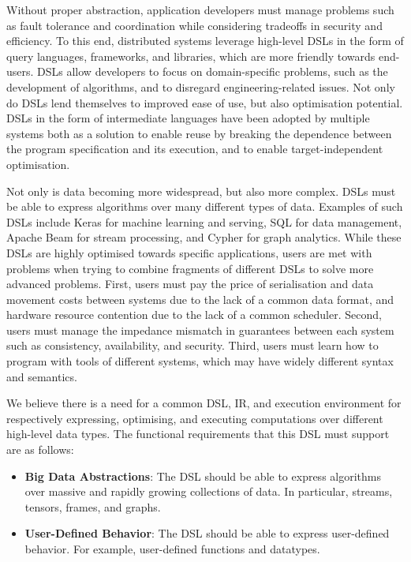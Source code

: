 Without proper abstraction, application developers must manage problems such as fault tolerance and coordination while considering tradeoffs in security and efficiency. To this end, distributed systems leverage high-level DSLs in the form of query languages, frameworks, and libraries, which are more friendly towards end-users. DSLs allow developers to focus on domain-specific problems, such as the development of algorithms, and to disregard engineering-related issues. Not only do DSLs lend themselves to improved ease of use, but also optimisation potential. DSLs in the form of intermediate languages have been adopted by multiple systems both as a solution to enable reuse by breaking the dependence between the program specification and its execution, and to enable target-independent optimisation.

Not only is data becoming more widespread, but also more complex. DSLs must be able to express algorithms over many different types of data. Examples of such DSLs include Keras\cite{Keras} for machine learning and serving, SQL for data management, Apache Beam\cite{Beam} for stream processing, and Cypher\cite{Cypher} for graph analytics. While these DSLs are highly optimised towards specific applications, users are met with problems when trying to combine fragments of different DSLs to solve more advanced problems. First, users must pay the price of serialisation and data movement costs between systems due to the lack of a common data format, and hardware resource contention due to the lack of a common scheduler. Second, users must manage the impedance mismatch in guarantees between each system such as consistency, availability, and security. Third, users must learn how to program with tools of different systems, which may have widely different syntax and semantics.

We believe there is a need for a common DSL, IR, and execution environment for respectively expressing, optimising, and executing computations over different high-level data types. The functional requirements that this DSL must support are as follows:

\begin{itemize}
  \item \textbf{Big Data Abstractions}: The DSL should be able to express algorithms over massive and rapidly growing collections of data. In particular, streams, tensors, frames, and graphs.
  \item \textbf{User-Defined Behavior}: The DSL should be able to express user-defined behavior. For example, user-defined functions and datatypes.
\end{itemize}

